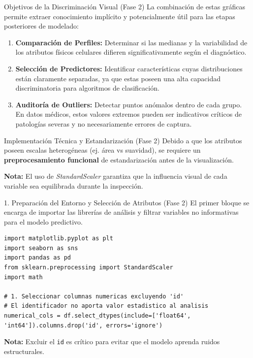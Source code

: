 \documentclass{beamer}
\begin{document}
	\begin{frame}{Objetivos de la Discriminación Visual (Fase 2)}
		La combinación de estas gráficas permite extraer conocimiento implícito y potencialmente útil para las etapas posteriores de modelado:
		\begin{enumerate}
			\item<2-> \textbf{Comparación de Perfiles:} Determinar si las medianas y la variabilidad de los atributos físicos celulares difieren significativamente según el diagnóstico.
			\item<3-> \textbf{Selección de Predictores:} Identificar características cuyas distribuciones están claramente separadas, ya que estas poseen una alta capacidad discriminatoria para algoritmos de clasificación.
			\item<4-> \textbf{Auditoría de Outliers:} Detectar puntos anómalos dentro de cada grupo. En datos médicos, estos valores extremos pueden ser indicativos críticos de patologías severas y no necesariamente errores de captura.
		\end{enumerate}
	\end{frame}
	
	\begin{frame}[fragile]{Implementación Técnica y Estandarización (Fase 2)}
		Debido a que los atributos poseen escalas heterogéneas (ej. área vs suavidad), se requiere un \textbf{preprocesamiento funcional} de estandarización antes de la visualización.
		\vspace{10pt}
		
		
		\textbf{Nota:} El uso de \textit{StandardScaler} garantiza que la influencia visual de cada variable sea equilibrada durante la inspección.
	\end{frame}
	
	\begin{frame}[fragile]{1. Preparación del Entorno y Selección de Atributos (Fase 2)}
		El primer bloque se encarga de importar las librerías de análisis y filtrar variables no informativas para el modelo predictivo.
		\onslide<2->\begin{lstlisting}[style=colab]
import matplotlib.pyplot as plt
import seaborn as sns
import pandas as pd
from sklearn.preprocessing import StandardScaler
import math

# 1. Seleccionar columnas numericas excluyendo 'id'
# El identificador no aporta valor estadistico al analisis
numerical_cols = df.select_dtypes(include=['float64', 'int64']).columns.drop('id', errors='ignore')
		\end{lstlisting}
		\textbf{Nota:} Excluir el \texttt{id} es crítico para evitar que el modelo aprenda ruidos estructurales.
	\end{frame}
	
\end{document}
